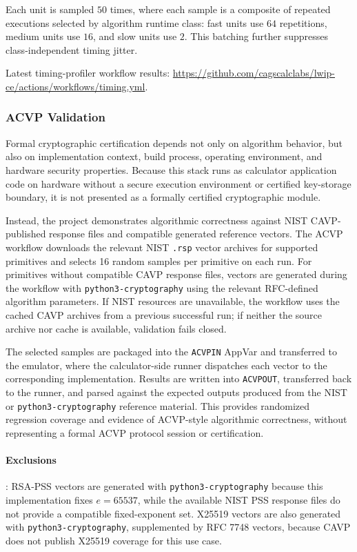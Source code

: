 \documentclass[titlepage]{report}
\begin{document}
	Each unit is sampled $50$ times, where each sample is a composite of repeated executions selected by algorithm runtime class: fast units use $64$ repetitions, medium units use $16$, and slow units use $2$. This batching further suppresses class-independent timing jitter.

	Latest timing-profiler workflow results: \url{https://github.com/cagscalclabs/lwip-ce/actions/workflows/timing.yml}.

	\subsubsection{ACVP Validation}

	Formal cryptographic certification depends not only on algorithm behavior, but also on implementation context, build process, operating environment, and hardware security properties. Because this stack runs as calculator application code on hardware without a secure execution environment or certified key-storage boundary, it is not presented as a formally certified cryptographic module.

	
	Instead, the project demonstrates algorithmic correctness against NIST CAVP-published response files and compatible generated reference vectors. The ACVP workflow downloads the relevant NIST \texttt{.rsp} vector archives for supported primitives and selects 16 random samples per primitive on each run. For primitives without compatible CAVP response files, vectors are generated during the workflow with \texttt{python3-cryptography} using the relevant RFC-defined algorithm parameters. If NIST resources are unavailable, the workflow uses the cached CAVP archives from a previous successful run; if neither the source archive nor cache is available, validation fails closed.

	The selected samples are packaged into the \texttt{ACVPIN} AppVar and transferred to the emulator, where the calculator-side runner dispatches each vector to the corresponding implementation. Results are written into \texttt{ACVPOUT}, transferred back to the runner, and parsed against the expected outputs produced from the NIST or \texttt{python3-cryptography} reference material. This provides randomized regression coverage and evidence of ACVP-style algorithmic correctness, without representing a formal ACVP protocol session or certification.

	\paragraph{Exclusions}: RSA-PSS vectors are generated with \texttt{python3-cryptography} because this implementation fixes $e=65537$, while the available NIST PSS response files do not provide a compatible fixed-exponent set. X25519 vectors are also generated with \texttt{python3-cryptography}, supplemented by RFC 7748 vectors, because CAVP does not publish X25519 coverage for this use case.
\end{document}
